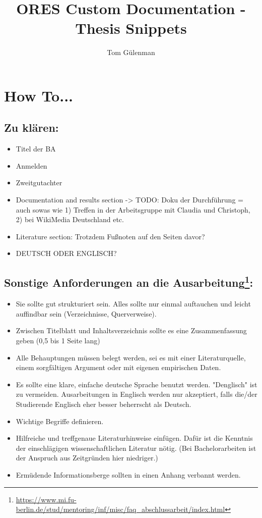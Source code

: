 \documentclass[12pt,a4paper]{article}
\title{ORES Custom Documentation - Thesis Snippets}
\author{Tom Gülenman}
\date{}
\begin{document}
\maketitle
\newpage
\tableofcontents
\newpage
\section*{How To...}
\subsection*{Zu klären:}
\begin{itemize}
\item Titel der BA
\item Anmelden
\item Zweitgutachter
\item Documentation and results section -> TODO: Doku der Durchführung = auch sowas wie 1) Treffen in der Arbeitsgruppe mit Claudia und Christoph, 2) bei WikiMedia Deutschland etc.
\item Literature section: Trotzdem Fußnoten auf den Seiten davor?
\item DEUTSCH ODER ENGLISCH?
\end{itemize}
\subsection*{Sonstige Anforderungen an die Ausarbeitung\footnote{\url{https://www.mi.fu-berlin.de/stud/mentoring/inf/misc/faq_abschlussarbeit/index.html}}:}
\begin{itemize}
\item Sie sollte gut strukturiert sein. Alles sollte nur einmal auftauchen und leicht auffindbar sein (Verzeichnisse, Querverweise).
\item Zwischen Titelblatt und Inhaltsverzeichnis sollte es eine Zusammenfassung geben (0,5 bis 1 Seite lang)
\item Alle Behauptungen müssen belegt werden, sei es mit einer Literaturquelle, einem sorgfältigen Argument oder mit eigenen empirischen Daten.
\item Es sollte eine klare, einfache deutsche Sprache benutzt werden. "Denglisch" ist zu vermeiden. Ausarbeitungen in Englisch werden nur akzeptiert, falls die/der Studierende Englisch eher besser beherrscht als Deutsch.
\item Wichtige Begriffe definieren.
\item Hilfreiche und treffgenaue Literaturhinweise einfügen. Dafür ist die Kenntnis der einschlägigen wissenschaftlichen Literatur nötig. (Bei Bachelorarbeiten ist der Anspruch aus Zeitgründen hier niedriger.)
\item Ermüdende Informationsberge sollten in einen Anhang verbannt werden.
\end{itemize}
\end{document}
